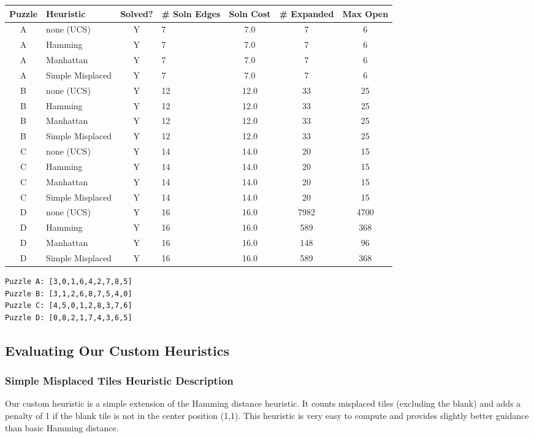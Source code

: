 \documentclass{article}
\begin{document}
{\flushleft
\begin{tabular}{|c|l|c|l|c|c|c|}
\hline
Puzzle & Heuristic & Solved? & \# Soln Edges & Soln Cost & \# Expanded & Max Open\\
\hline
A & none (UCS) & Y & 7 & 7.0 & 7 & 6 \\
\hline
A & Hamming & Y & 7 & 7.0 & 7 & 6 \\
\hline
A & Manhattan & Y & 7 & 7.0 & 7 & 6 \\
\hline
A & Simple Misplaced & Y & 7 & 7.0 & 7 & 6 \\
\hline
B & none (UCS) & Y & 12 & 12.0 & 33 & 25 \\
\hline
B & Hamming & Y & 12 & 12.0 & 33 & 25 \\
\hline
B & Manhattan & Y & 12 & 12.0 & 33 & 25 \\
\hline
B & Simple Misplaced & Y & 12 & 12.0 & 33 & 25 \\
\hline
C & none (UCS) & Y & 14 & 14.0 & 20 & 15 \\
\hline
C & Hamming & Y & 14 & 14.0 & 20 & 15 \\
\hline
C & Manhattan & Y & 14 & 14.0 & 20 & 15 \\
\hline
C & Simple Misplaced & Y & 14 & 14.0 & 20 & 15 \\
\hline
D & none (UCS) & Y & 16 & 16.0 & 7982 & 4700 \\
\hline
D & Hamming & Y & 16 & 16.0 & 589 & 368 \\
\hline
D & Manhattan & Y & 16 & 16.0 & 148 & 96 \\
\hline
D & Simple Misplaced & Y & 16 & 16.0 & 589 & 368 \\
\hline

\end{tabular} }

\begin{verbatim}
Puzzle A: [3,0,1,6,4,2,7,8,5]
Puzzle B: [3,1,2,6,8,7,5,4,0]
Puzzle C: [4,5,0,1,2,8,3,7,6]
Puzzle D: [0,8,2,1,7,4,3,6,5]
\end{verbatim}

\subsection{Evaluating Our Custom Heuristics}

\subsubsection{Simple Misplaced Tiles Heuristic Description}
Our custom heuristic is a simple extension of the Hamming distance heuristic. It counts misplaced tiles (excluding the blank) and adds a penalty of 1 if the blank tile is not in the center position (1,1). This heuristic is very easy to compute and provides slightly better guidance than basic Hamming distance.
\end{document}
